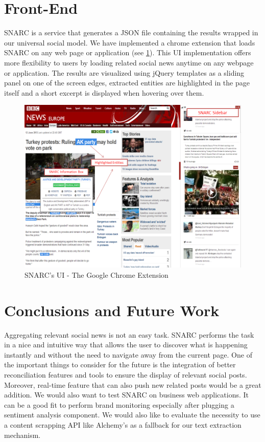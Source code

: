 \documentclass[oribibl]{../../Tools/LaTEX/llncs}
\begin{document}

\section{Front-End}
SNARC is a service that generates a JSON file containing the results wrapped in our universal social model. We have implemented a chrome extension that loads SNARC on any web page or application (see \ref{fig:SNARC_UI_annotated}). This UI implementation offers more flexibility to users by loading related social news anytime on any webpage or application. The results are visualized using jQuery templates as a sliding panel on one of the screen edges, extracted entities are highlighted in the page itself and a short excerpt is displayed when hovering over them.

\begin{figure}[!ht]
  \centering
    \includegraphics[scale=0.45]{SNARC_UI_annotated.png}
  \caption{SNARC's UI - The Google Chrome Extension}
  \label{fig:SNARC_UI_annotated}
\end{figure}



\section{Conclusions and Future Work}

Aggregating relevant social news is not an easy task. SNARC performs the task in a nice and intuitive way that allows the user to discover what is happening instantly and without the need to navigate away from the current page. One of the important things to consider for the future is the integration of better reconciliation features and tools to ensure the display of relevant social posts. Moreover, real-time feature that can also push new related posts would be a great addition. We would also want to test SNARC on business web applications. It can be a good fit to perform brand monitoring especially after plugging a sentiment analysis component. We would also like to evaluate the necessity to use a content scrapping API like Alchemy’s as a fallback for our text extraction mechanism.



\end{document}
